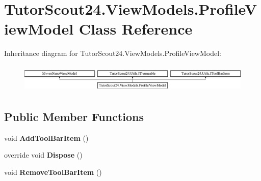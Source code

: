\hypertarget{class_tutor_scout24_1_1_view_models_1_1_profile_view_model}{}\section{Tutor\+Scout24.\+View\+Models.\+Profile\+View\+Model Class Reference}
\label{class_tutor_scout24_1_1_view_models_1_1_profile_view_model}
Inheritance diagram for Tutor\+Scout24.\+View\+Models.\+Profile\+View\+Model\+:\begin{figure}[H]
\begin{center}
\leavevmode
\includegraphics[height=1.372549cm]{class_tutor_scout24_1_1_view_models_1_1_profile_view_model}
\end{center}
\end{figure}
\subsection*{Public Member Functions}
\begin{DoxyCompactItemize}
\item 
\mbox{\label{class_tutor_scout24_1_1_view_models_1_1_profile_view_model_aa6d7a6497ea2ede04db77655f5317d27}} 
void {\bfseries Add\+Tool\+Bar\+Item} ()
\item 
\mbox{\label{class_tutor_scout24_1_1_view_models_1_1_profile_view_model_a51bf3039490d546cf6511a4e45ab3a44}} 
override void {\bfseries Dispose} ()
\item 
\mbox{\label{class_tutor_scout24_1_1_view_models_1_1_profile_view_model_a7b8951a58c863c2005de3b2952036fe0}} 
void {\bfseries Remove\+Tool\+Bar\+Item} ()
\end{DoxyCompactItemize}
